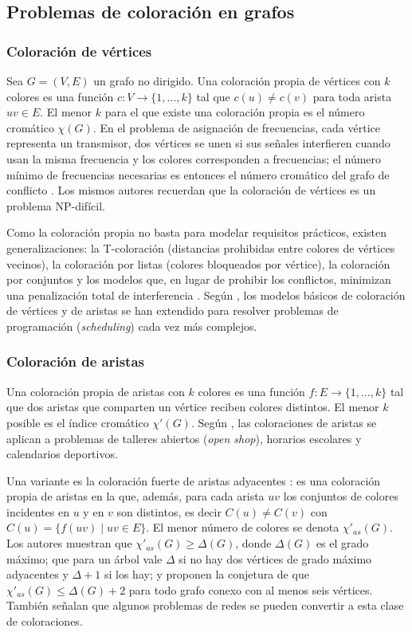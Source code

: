 \documentclass[11pt]{article}
\begin{document}
\subsection{Problemas de coloración en grafos}
\label{sec:coloracion}

\subsubsection{Coloración de vértices}

Sea $G=(V,E)$ un grafo no dirigido. Una coloración propia de vértices con $k$ colores es una función $c:V\to\{1,\dots,k\}$ tal que $c(u)\neq c(v)$ para toda arista $uv\in E$. El menor $k$ para el que existe una coloración propia es el número cromático $\chi(G)$. En el problema de asignación de frecuencias, cada vértice representa un transmisor, dos vértices se unen si sus señales interfieren cuando usan la misma frecuencia y los colores corresponden a frecuencias; el número mínimo de frecuencias necesarias es entonces el número cromático del grafo de conflicto \parencite{eisenblatter2002}. Los mismos autores recuerdan que la coloración de vértices es un problema NP-difícil.

Como la coloración propia no basta para modelar requisitos prácticos, existen generalizaciones: la T-coloración (distancias prohibidas entre colores de vértices vecinos), la coloración por listas (colores bloqueados por vértice), la coloración por conjuntos y los modelos que, en lugar de prohibir los conflictos, minimizan una penalización total de interferencia \parencite{eisenblatter2002}. Según \textcite{dewerra2015}, los modelos básicos de coloración de vértices y de aristas se han extendido para resolver problemas de programación (\textit{scheduling}) cada vez más complejos.

\subsubsection{Coloración de aristas}

Una coloración propia de aristas con $k$ colores es una función $f:E\to\{1,\dots,k\}$ tal que dos aristas que comparten un vértice reciben colores distintos. El menor $k$ posible es el índice cromático $\chi'(G)$. Según \textcite{dewerra2015}, las coloraciones de aristas se aplican a problemas de talleres abiertos (\textit{open shop}), horarios escolares y calendarios deportivos.

Una variante es la coloración fuerte de aristas adyacentes \parencite{zhang2002}: es una coloración propia de aristas en la que, además, para cada arista $uv$ los conjuntos de colores incidentes en $u$ y en $v$ son distintos, es decir $C(u)\neq C(v)$ con $C(u)=\{f(uv)\mid uv\in E\}$. El menor número de colores se denota $\chi'_{as}(G)$. Los autores muestran que $\chi'_{as}(G)\geq\Delta(G)$, donde $\Delta(G)$ es el grado máximo; que para un árbol vale $\Delta$ si no hay dos vértices de grado máximo adyacentes y $\Delta+1$ si los hay; y proponen la conjetura de que $\chi'_{as}(G)\leq\Delta(G)+2$ para todo grafo conexo con al menos seis vértices. También señalan que algunos problemas de redes se pueden convertir a esta clase de coloraciones.
\end{document}
